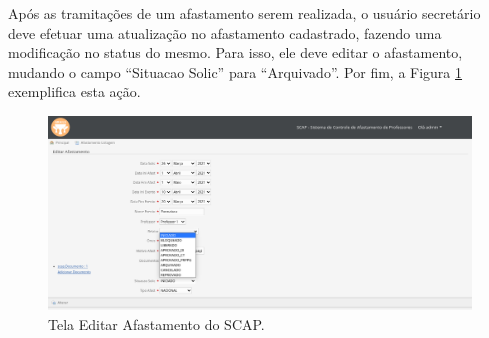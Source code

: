 Após as tramitações de um afastamento serem realizada, o usuário secretário deve efetuar uma atualização no afastamento cadastrado, fazendo uma modificação no status do mesmo. Para isso, ele deve editar o afastamento, mudando o campo ``Situacao Solic'' para ``Arquivado''. Por fim, a Figura \ref{fig-projeto-editar-afastamento} exemplifica esta ação.

\begin{figure}[h]
	\centering
	\includegraphics[scale=0.33]{figuras/fig-projeto-editar-afastamento} 
	\caption{Tela Editar Afastamento do SCAP.}
	\label{fig-projeto-editar-afastamento}
\end{figure}

